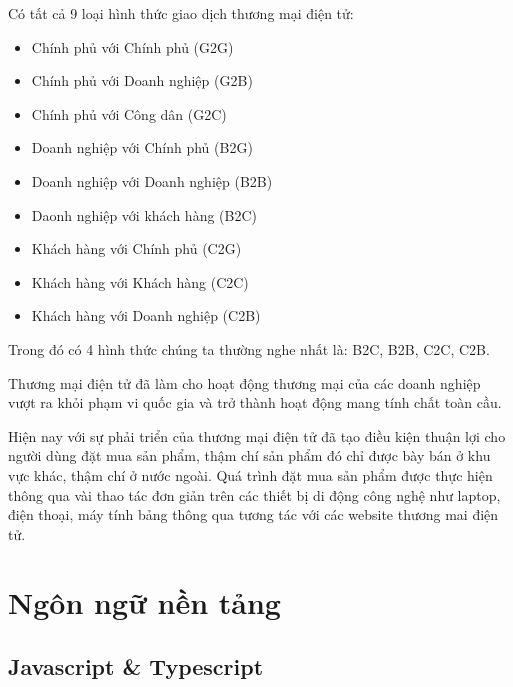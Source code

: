 Có tất cả 9 loại hình thức giao dịch thương mại điện tử: \par
 \begin{itemize}
    \item Chính phủ với Chính phủ (G2G)
    \item Chính phủ với Doanh nghiệp (G2B)
    \item Chính phủ với Công dân (G2C)
    \item Doanh nghiệp với Chính phủ (B2G)
    \item Doanh nghiệp với Doanh nghiệp (B2B)
    \item Daonh nghiệp với khách hàng (B2C)
    \item Khách hàng với Chính phủ (C2G)
    \item Khách hàng với Khách hàng (C2C)
    \item Khách hàng với Doanh nghiệp (C2B)
  \end{itemize}

\par Trong đó có 4 hình thức chúng ta thường nghe nhất là: B2C, B2B, C2C, C2B. \par 

Thương mại điện tử đã làm cho hoạt động thương mại của các doanh nghiệp vượt ra khỏi phạm vi quốc gia và trở thành hoạt động mang tính chất toàn cầu. \par

Hiện nay với sự phải triển của thương mại điện tử đã tạo điều kiện thuận lợi cho người dùng đặt mua sản phẩm, thậm chí sản phẩm đó chỉ được bày bán ở khu vực khác, thậm chí ở nước ngoài. Quá trình đặt mua sản phẩm được thực hiện thông qua vài thao tác đơn giản trên các thiết bị di động công nghệ như laptop, điện thoại, máy tính bảng thông qua tương tác với các website thương mai điện tử. \par
\section{Ngôn ngữ nền tảng}
\subsection{Javascript \& Typescript}
